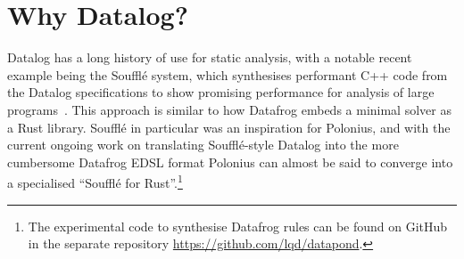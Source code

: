 \documentclass[11pt,a4paper,twoside,openany]{report}
\begin{document}
\section{Why Datalog?}\label{sec:why-datalog}

Datalog has a long history of use for static analysis, with a notable recent
example being the Souffl{\'e} system, which synthesises performant C++ code from
the Datalog specifications to show promising performance for analysis of large
programs~\cite{scholz_fast_2016}. This approach is similar to how Datafrog
embeds a minimal solver as a Rust library. Souffl{\'e} in particular was an
inspiration for Polonius, and with the current ongoing work on translating
Souffl{\'e}-style Datalog into the more cumbersome Datafrog EDSL format Polonius
can almost be said to converge into a specialised ``Souffl{\'e} for
Rust''.\footnote{The experimental code to synthesise Datafrog rules can be found
  on GitHub in the separate repository \url{https://github.com/lqd/datapond}.}


\end{document}
